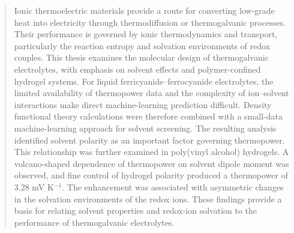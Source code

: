 \begin{abstract}

Ionic thermoelectric materials provide a route for converting low-grade heat
into electricity through thermodiffusion or thermogalvanic processes. Their
performance is governed by ionic thermodynamics and transport, particularly
the reaction entropy and solvation environments of redox couples. This thesis
examines the molecular design of thermogalvanic electrolytes, with emphasis on
solvent effects and polymer-confined hydrogel systems. For liquid
ferricyanide--ferrocyanide electrolytes, the limited availability of
thermopower data and the complexity of ion--solvent interactions make direct
machine-learning prediction difficult. Density functional theory calculations
were therefore combined with a small-data machine-learning approach for
solvent screening. The resulting analysis identified solvent polarity as an
important factor governing thermopower. This relationship was further examined
in poly(vinyl alcohol) hydrogels. A
volcano-shaped dependence of thermopower on solvent dipole moment was observed,
and fine control of hydrogel polarity produced a thermopower of
3.28 mV K$^{-1}$. The enhancement was associated with asymmetric changes in
the solvation environments of the redox ions. These findings provide a basis
for relating solvent properties and redox-ion solvation to the performance of
thermogalvanic electrolytes.

\end{abstract}
